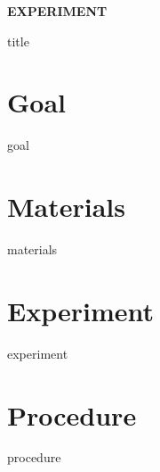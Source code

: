 \documentclass[cover.tex]{subfiles}
\begin{document}
 
\begin{refsection}


\hfill\vspace{0.2cm}\begin{center}{\large \bfseries EXPERIMENT {\thesection}\par\Huge
 {title}
 \\[5pt] \par}\vspace{0.2cm}\end{center}\par\noindent
 
 
\section*{Goal}
 {goal}
\section*{Materials}
 {materials}
\section*{Experiment}
{experiment}

\printbibliography[heading=subbibliography]
\section*{Procedure}
{procedure}%







\end{refsection}
\end{document}
